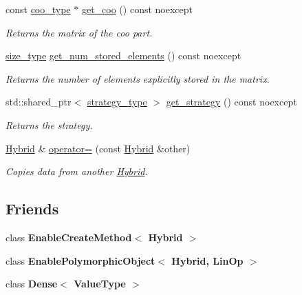 \begin{DoxyCompactItemize}
const \hyperlink{classgko_1_1matrix_1_1Coo}{coo\+\_\+type} $\ast$ \hyperlink{classgko_1_1matrix_1_1Hybrid_a80eb99775093553db1029b9675f34e2c}{get\+\_\+coo} () const noexcept
\begin{DoxyCompactList}\small\item\em Returns the matrix of the coo part. \end{DoxyCompactList}\item 
\hyperlink{namespacegko_a6e5c95df0ae4e47aab2f604a22d98ee7}{size\+\_\+type} \hyperlink{classgko_1_1matrix_1_1Hybrid_a00e86ba08ecfc46dbc9b74b800d10a8d}{get\+\_\+num\+\_\+stored\+\_\+elements} () const noexcept
\begin{DoxyCompactList}\small\item\em Returns the number of elements explicitly stored in the matrix. \end{DoxyCompactList}\item 
std\+::shared\+\_\+ptr$<$ \hyperlink{classgko_1_1matrix_1_1Hybrid_1_1strategy__type}{strategy\+\_\+type} $>$ \hyperlink{classgko_1_1matrix_1_1Hybrid_a8be764050176291d35e7b4dee1b6e1bc}{get\+\_\+strategy} () const noexcept
\begin{DoxyCompactList}\small\item\em Returns the strategy. \end{DoxyCompactList}\item 
\hyperlink{classgko_1_1matrix_1_1Hybrid}{Hybrid} \& \hyperlink{classgko_1_1matrix_1_1Hybrid_a401af55be629372e3114b67df6fc4d04}{operator=} (const \hyperlink{classgko_1_1matrix_1_1Hybrid}{Hybrid} \&other)
\begin{DoxyCompactList}\small\item\em Copies data from another \hyperlink{classgko_1_1matrix_1_1Hybrid}{Hybrid}. \end{DoxyCompactList}\end{DoxyCompactItemize}
\subsection*{Friends}
\begin{DoxyCompactItemize}
\item 
\mbox{\label{classgko_1_1matrix_1_1Hybrid_a6e007d7f34688b24757931d9b29b553d}} 
class {\bfseries Enable\+Create\+Method$<$ Hybrid $>$}
\item 
\mbox{\label{classgko_1_1matrix_1_1Hybrid_a5daaa720a8e5d05fd99206759d6e3649}} 
class {\bfseries Enable\+Polymorphic\+Object$<$ Hybrid, Lin\+Op $>$}
\item 
\mbox{\label{classgko_1_1matrix_1_1Hybrid_a22a84c8f67f946aa60a2fa8bf5835a32}} 
class {\bfseries Dense$<$ Value\+Type $>$}
\end{DoxyCompactItemize}
